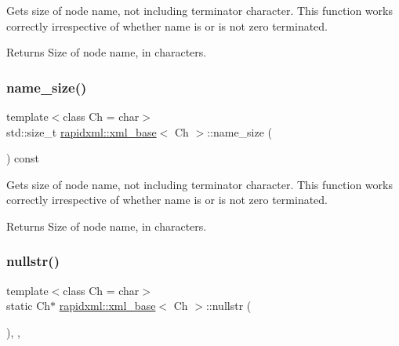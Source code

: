 Gets size of node name, not including terminator character. This function works correctly irrespective of whether name is or is not zero terminated. \begin{DoxyReturn}{Returns}
Size of node name, in characters. 
\end{DoxyReturn}
\mbox{\label{classrapidxml_1_1xml__base_a20c8ffbe0c7a0b4231681ab8b99330a4}} 
\subsubsection{\texorpdfstring{name\+\_\+size()}{name\_size()}\hspace{0.1cm}{\footnotesize\ttfamily [2/2]}}
{\footnotesize\ttfamily template$<$class Ch  = char$>$ \\
std\+::size\+\_\+t \mbox{\hyperlink{classrapidxml_1_1xml__base}{rapidxml\+::xml\+\_\+base}}$<$ Ch $>$\+::name\+\_\+size (\begin{DoxyParamCaption}{ }\end{DoxyParamCaption}) const\hspace{0.3cm}{\ttfamily [inline]}}

Gets size of node name, not including terminator character. This function works correctly irrespective of whether name is or is not zero terminated. \begin{DoxyReturn}{Returns}
Size of node name, in characters. 
\end{DoxyReturn}
\mbox{\label{classrapidxml_1_1xml__base_ad96ff6b1e41dab3ff60b9bc4df769a75}} 
\subsubsection{\texorpdfstring{nullstr()}{nullstr()}\hspace{0.1cm}{\footnotesize\ttfamily [1/2]}}
{\footnotesize\ttfamily template$<$class Ch  = char$>$ \\
static Ch$\ast$ \mbox{\hyperlink{classrapidxml_1_1xml__base}{rapidxml\+::xml\+\_\+base}}$<$ Ch $>$\+::nullstr (\begin{DoxyParamCaption}{ }\end{DoxyParamCaption})\hspace{0.3cm}{\ttfamily [inline]}, {\ttfamily [static]}, {\ttfamily [protected]}}

